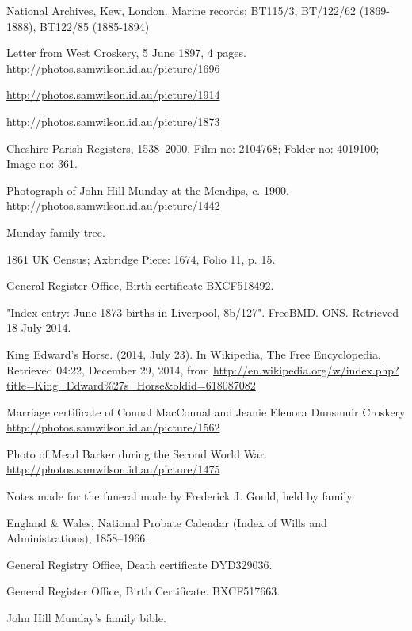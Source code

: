 \begin{thebibliography}{99}
	National Archives, Kew, London.
	Marine records: BT115/3, BT/122/62 (1869-1888), BT122/85 (1885-1894)

	Letter from West Croskery, 5 June 1897, 4 pages.
	\url{http://photos.samwilson.id.au/picture/1696}

	\url{http://photos.samwilson.id.au/picture/1914}

	\url{http://photos.samwilson.id.au/picture/1873}

	Cheshire Parish Registers, 1538--2000, Film no: 2104768; Folder no: 4019100; Image no: 361.

	Photograph of John Hill Munday at the Mendips, c. 1900.
	\url{http://photos.samwilson.id.au/picture/1442}

	Munday family tree.

	1861 UK Census; Axbridge Piece: 1674, Folio 11, p. 15.

	General Register Office, Birth certificate BXCF518492.

	"Index entry: June 1873 births in Liverpool, 8b/127". FreeBMD. ONS. Retrieved 18 July 2014. 

	King Edward's Horse. (2014, July 23). In Wikipedia, The Free Encyclopedia. Retrieved 04:22, December 29, 2014,
	from \url{http://en.wikipedia.org/w/index.php?title=King_Edward\%27s_Horse&oldid=618087082}

	Marriage certificate of Connal MacConnal and Jeanie Elenora Dunsmuir Croskery
	\url{http://photos.samwilson.id.au/picture/1562}

	Photo of Mead Barker during the Second World War. \\
	\url{http://photos.samwilson.id.au/picture/1475}

	Notes made for the funeral made by Frederick J. Gould, held by family.

	England \& Wales, National Probate Calendar (Index of Wills and Administrations), 1858--1966.

	General Registry Office, Death certificate DYD329036.

	General Register Office, Birth Certificate. BXCF517663.

	John Hill Munday's family bible.


\end{thebibliography}
